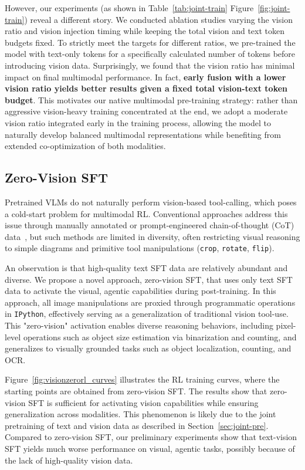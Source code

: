 However, our experiments (as shown in Table~\ref{tab:joint-train} Figure~\ref{fig:joint-train}) reveal a different story. We conducted ablation studies varying the vision ratio and vision injection timing while keeping the total vision and text token budgets fixed. To strictly meet the targets for different ratios, we pre-trained the model with text-only tokens for a specifically calculated number of tokens before introducing vision data. Surprisingly, we found that the vision ratio has minimal impact on final multimodal performance. In fact, \textbf{early fusion with a lower vision ratio yields better results given a fixed total vision-text token budget}. 
This motivates our native multimodal pre-training strategy: rather than aggressive vision-heavy training concentrated at the end, we adopt a moderate vision ratio integrated early in the training process, allowing the model to naturally develop balanced multimodal representations while benefiting from extended co-optimization of both modalities.

\subsection{Zero-Vision SFT}

Pretrained VLMs do not naturally perform vision-based tool-calling, which poses a cold-start problem for multimodal RL. Conventional approaches address this issue through manually annotated or prompt-engineered chain-of-thought (CoT) data~\citep{bai2025qwen3vltechnicalreport}, but such methods are limited in diversity, often restricting visual reasoning to simple diagrams and primitive tool manipulations (\texttt{crop}, \texttt{rotate}, \texttt{flip}).

An observation is that high-quality text SFT data are relatively abundant and diverse.
We propose a novel approach, zero-vision SFT, that uses only text SFT data to activate the visual, agentic capabilities during post-training.
In this approach, all image manipulations are proxied through programmatic operations in \texttt{IPython}, effectively serving as a generalization of traditional vision tool-use. This "zero-vision" activation enables diverse reasoning behaviors, including pixel-level operations such as object size estimation via binarization and counting, and generalizes to visually grounded tasks such as object localization, counting, and OCR. 

Figure~\ref{fig:visionzerorl_curves} illustrates the RL training curves, where the starting points are obtained from zero-vision SFT. The results show that zero-vision SFT is sufficient for activating vision capabilities while ensuring generalization across modalities. This phenomenon is likely due to the joint pretraining of text and vision data as described in Section~\ref{sec:joint-pre}. Compared to zero-vision SFT, our preliminary experiments show that text-vision SFT yields much worse performance on visual, agentic tasks, possibly because of the lack of high-quality vision data.


